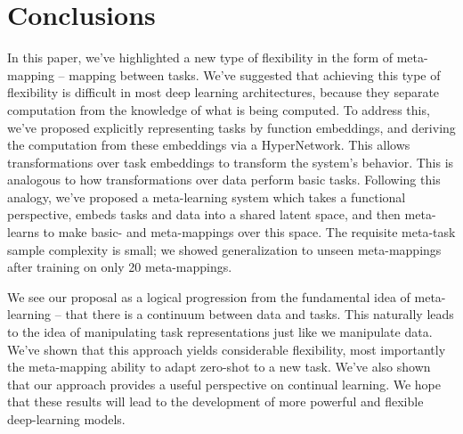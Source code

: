 \documentclass{article}
\begin{document}
\section{Conclusions}
\vspace{-0.5em} %
In this paper, we've highlighted a new type of flexibility in the form of meta-mapping -- mapping between tasks. We've suggested that achieving this type of flexibility is difficult in most deep learning architectures, because they separate computation from the knowledge of what is being computed. To address this, we've proposed explicitly representing tasks by function embeddings, and deriving the computation from these embeddings via a HyperNetwork. This allows transformations over task embeddings to transform the system's behavior. This is analogous to how transformations over data perform basic tasks. Following this analogy, we've proposed a meta-learning system which takes a functional perspective, embeds tasks and data into a shared latent space, and then meta-learns to make basic- and meta-mappings over this space. The requisite meta-task sample complexity is small; we showed generalization to unseen meta-mappings after training on only 20 meta-mappings.\par
We see our proposal as a logical progression from the fundamental idea of meta-learning -- that there is a continuum between data and tasks. This naturally leads to the idea of manipulating task representations just like we manipulate data. We've shown that this approach yields considerable flexibility, most importantly the meta-mapping ability to adapt zero-shot to a new task. We've also shown that our approach provides a useful perspective on continual learning. We hope that these results will lead to the development of more powerful and flexible deep-learning models. \par




\newpage

\end{document}

